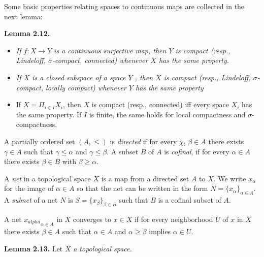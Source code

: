 \documentclass[12pt]{article}
\begin{document}
            Some basic properties relating spaces to continuous maps are collected in the next lemma:



\textbf{Lemma 2.12.} 


        \begin{itemize}

            \item \emph{If $ f : X \to Y $ is a continuous surjective map, then $ Y $ is compact (resp., Lindeloff, $\sigma$-compact,
            connected) whenever $ X $ has the same property.}
                
            \item \emph{If $ X $ is a closed subspace of a space $ Y $ , then $ X $ is compact (resp., Lindeloff, $\sigma$-compact, locally compact)
            whenever $ Y $ has the same property}

            \item If $ X = \Pi_{i \in I} X_i $, then $ X $ is compact (resp., connected) iff every space $ X_i $ has the same property. If $ I $ is
            finite, the same holds for local compactness and $\sigma$-compactness.
                
        \end{itemize}


        A partially ordered set $ (A, \leq) $ is \emph{directed} if for every $ \chi $, $ \beta \in A $ there exists $ \gamma \in A $ such that $ \gamma \leq \alpha $ and $ \gamma \leq \beta $.
    A subset $ B $ of $ A $ is \emph{cofinal}, if for every $ \alpha \in A $ there exists $ \beta \in B $ with $ \beta \geq \alpha $.
    

        A \emph{net} in a topological space $ X $ is a map from a directed set $ A $ to $ X $. We write $ x_\alpha $ for the image of $ \alpha \in A $ so
    that the net can be written in the form $ N = \{x_{\alpha}\}_{\alpha \in A} $. A \emph{subnet} of a net $ N $ is $ S = \{x_{\beta}\}_{\beta \in B} $ such that $ B $ is a
    cofinal subset of $ A $.
    

        A net ${x_{alpha}}_{\alpha \in A}$ in $ X $ converges to $ x \in X $ if for every neighborhood $ U $ of $ x $ in $ X $ there exists $ \beta \in A $ such that
    $ \alpha \in A $ and $ \alpha \geq \beta $ implies $ \alpha \in U $.    


\textbf{Lemma 2.13.} Let $ X $ \emph{a topological space.}
\end{document}
